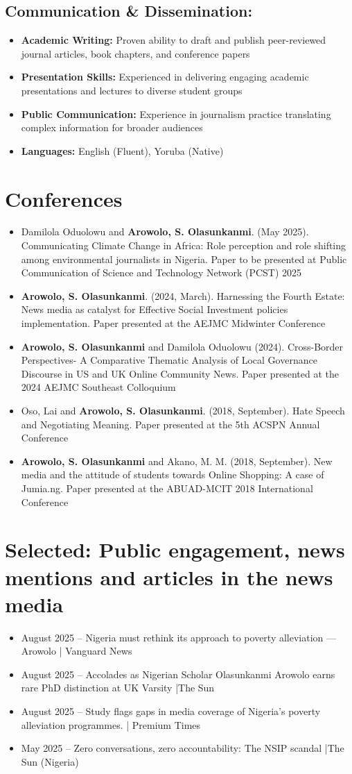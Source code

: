 \documentclass[a4paper,11pt]{article}
\newcommand{\resumeItem}[1]{
  \item\small{
    {#1 \vspace{-2pt}}
  }
}
\newcommand{\resumeItemListStart}{\begin{itemize}}
\newcommand{\resumeItemListEnd}{\end{itemize}\vspace{-5pt}}
\begin{document}
\subsection{Communication \& Dissemination:}
    \resumeItemListStart
        \resumeItem{\textbf{Academic Writing:} Proven ability to draft and publish peer-reviewed journal articles, book chapters, and conference papers}
        \resumeItem{\textbf{Presentation Skills:} Experienced in delivering engaging academic presentations and lectures to diverse student groups}
        \resumeItem{\textbf{Public Communication:} Experience in journalism practice translating complex information for broader audiences}
        \resumeItem{\textbf{Languages:} English (Fluent), Yoruba (Native)}
    \resumeItemListEnd

\section{Conferences}
    \resumeItemListStart
        \resumeItem{Damilola Oduolowu and \textbf{Arowolo, S. Olasunkanmi}. (May 2025). Communicating Climate Change in Africa: Role perception and role shifting among environmental journalists in Nigeria. Paper to be presented at Public Communication of Science and Technology Network (PCST) 2025}
        \resumeItem{\textbf{Arowolo, S. Olasunkanmi}. (2024, March). Harnessing the Fourth Estate: News media as catalyst for Effective Social Investment policies implementation. Paper presented at the AEJMC Midwinter Conference}
        \resumeItem{\textbf{Arowolo, S. Olasunkanmi} and Damilola Oduolowu (2024). Cross-Border Perspectives- A Comparative Thematic Analysis of Local Governance Discourse in US and UK Online Community News. Paper presented at the 2024 AEJMC Southeast Colloquium}
        \resumeItem{Oso, Lai and \textbf{Arowolo, S. Olasunkanmi}. (2018, September). Hate Speech and Negotiating Meaning. Paper presented at the 5th ACSPN Annual Conference}
        \resumeItem{\textbf{Arowolo, S. Olasunkanmi} and Akano, M. M. (2018, September). New media and the attitude of students towards Online Shopping: A case of Jumia.ng. Paper presented at the ABUAD-MCIT 2018 International Conference}
    \resumeItemListEnd

\section{Selected: Public engagement, news mentions and articles in the news media}
    \resumeItemListStart
        \resumeItem{August 2025 – Nigeria must rethink its approach to poverty alleviation — Arowolo | Vanguard News}
        \resumeItem{August 2025 – Accolades as Nigerian Scholar Olasunkanmi Arowolo earns rare PhD distinction at UK Varsity |The Sun}
        \resumeItem{August 2025 – Study flags gaps in media coverage of Nigeria's poverty alleviation programmes. | Premium Times}
        \resumeItem{May 2025 – Zero conversations, zero accountability: The NSIP scandal |The Sun (Nigeria)}
    \resumeItemListEnd
\end{document}
